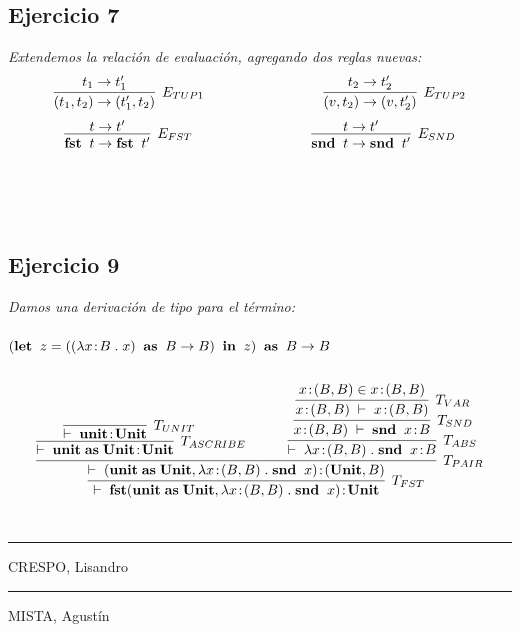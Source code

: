 \documentclass[a4paper,10pt]{article}
\begin{document}
\pagebreak
\subsection*{Ejercicio 7} 
	\emph{Extendemos la relación de evaluación, agregando dos reglas nuevas:}
	\\
	\begin{align*}
		\infer[E_{TUP1}]{
			(t_{1},t_{2}) \rightarrow (t_{1}',t_{2})
		}{
			t_{1} \rightarrow t_{1}'
		} \hspace{3cm}
		\infer[E_{TUP2}]{
			(v,t_{2}) \rightarrow (v,t_{2}')
		}{
			t_{2} \rightarrow t_{2}'
		}
	\end{align*}
	\begin{align*}
		\infer[E_{FST}]{
			{\bf fst}\;\;t \rightarrow {\bf fst}\;\;t'
		}{
			t \rightarrow t'
		} \hspace{3cm}
		\infer[E_{SND}]{
			{\bf snd}\;\;t \rightarrow {\bf snd}\;\;t'
		}{
			t \rightarrow t'
		}
	\end{align*}
	\\
	\\
	\\	
\subsection*{Ejercicio 9} 
	\emph{Damos una derivación de tipo para el término:
		\\
		\\ 
		\indent $({\bf let}\;\;z=((\lambda x\!:\!B\;.\;x)\;\;{\bf as}\;\;B \rightarrow B)\;\;{\bf in}\;\;z)\;\;{\bf as}\;\;B \rightarrow B$
	}
	\\
	\\
	\begin{align*}
		\infer[T_{FST}]{
			\vdash \; {\bf fst}({\bf unit} \;{\bf as}\; {\bf Unit},\lambda x\!:\!(B,B)\;.\;{\bf snd}\;\;x)\!:\!{\bf Unit}
		}{
			\infer[T_{PAIR}]
			{
				\vdash \; ({\bf unit} \;{\bf as}\; {\bf Unit},\lambda x\!:\!(B,B)\;.\;{\bf snd}\;\;x)\!:\!({\bf Unit}, B)
			}
			{
				\infer[T_{ASCRIBE}]
				{
					\vdash \; {\bf unit}\;{\bf as}\;{\bf Unit}\!:\!{\bf Unit}
				}
				{
					\infer[T_{UNIT}]
					{
						\vdash \; {\bf unit}\!:\!{\bf Unit}
					}
					{}
				} & \qquad
				\infer[T_{ABS}]
				{
					\vdash \; \lambda x\!:\!(B,B) \;.\;{\bf snd}\;\;x\!:\!B
				}
				{
					\infer[T_{SND}]
					{
						x\!:\!(B,B) \; \vdash \; {\bf snd} \;\; x\!:\!B
					}
					{
						\infer[T_{VAR}]
						{
							x\!:\!(B,B) \; \vdash \; x\!:\!(B,B)
						}{
							x\!:\!(B,B) \in x\!:\!(B,B)
						}
					}
				}
			}
		}
	\end{align*}
\\
\vspace{\fill}
\begin{multicols}{2}
	\hrule
	\vspace{5pt}
	CRESPO, Lisandro \\
	\linebreak
	\hrule
	\vspace{5pt}
	MISTA, Agustín \\
\end{multicols}
\end{document}
